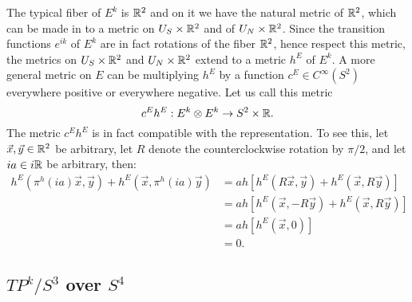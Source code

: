 The typical fiber of $E^k$ is $\mathbb{R}^2$ and on it we have the natural metric of $\mathbb{R}^2$, which can be made in to a metric on $U_S \times \mathbb{R}^2$ and of $U_N \times \mathbb{R}^2$. Since the transition functions $e^{ik}$ of $E^k$ are in fact rotations of the fiber $\mathbb{R}^2$, hence respect this metric, the metrics on $U_S \times \mathbb{R}^2$ and $U_N \times \mathbb{R}^2$ extend to a metric $h^E$ of $E^k$. A more general metric on $E$ can be multiplying $h^E$ by a function $c^E \in C^\infty(S^2)$ everywhere positive or everywhere negative. Let us call this metric
\begin{equation}
    c^E h^E : E^k \otimes E^k \to S^2 \times \mathbb{R}.
\end{equation}
The metric $c^E h^E$ is in fact compatible with the representation. To see this, let $\vec x, \vec y \in \mathbb{R}^2$ be arbitrary, let $R$ denote the counterclockwise rotation by $\pi/2$, and let $ia \in i\mathbb{R}$ be arbitrary, then:
\begin{align*}
    h^E(\pi^h(ia) \vec x, \vec y) + h^E(\vec x, \pi^h(ia) \vec y) &= ah[h^E(R \vec x, \vec y) + h^E(\vec x, R \vec y)]\\
        &= ah[h^E(\vec x, -R \vec y) + h^E(\vec x, R \vec y)]\\
        &= ah[h^E(\vec x, 0)]\\
        &= 0.
\end{align*}


\subsection{$TP^k/S^3$ over $S^4$}
\label{chIntegrationSubsectionS2}

